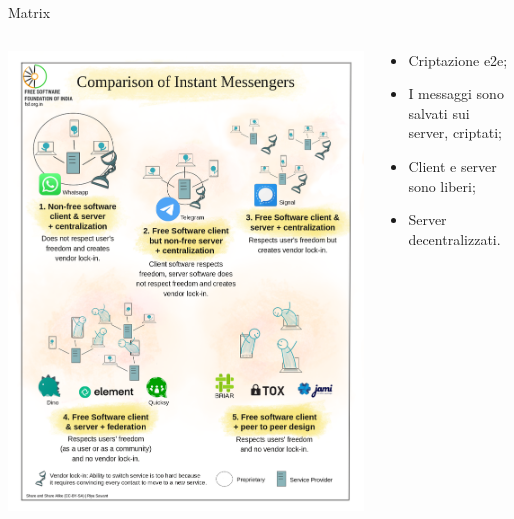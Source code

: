 \begin{myframe}{Matrix}
  \begin{columns}
    \begin{column}{.5\textwidth}
      \includegraphics[width=.9\textwidth]{img/chat}
    \end{column}
    \begin{column}{.5\textwidth}
      \begin{itemize}[<+->]
        \item Criptazione e2e;
        \item I messaggi sono salvati sui server, criptati;
        \item Client e server sono liberi;
        \item Server decentralizzati.
      \end{itemize}
    \end{column}
  \end{columns}
\end{myframe}

